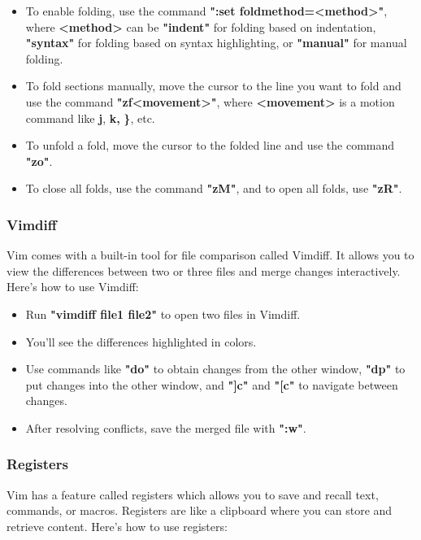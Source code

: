 \documentclass[titlepage]{article}
\begin{document}
\begin{itemize}
\item To enable folding, use the command \textbf{":set foldmethod=<method>"}, where \textbf{<method>} can be \textbf{"indent"} for folding based on indentation, \textbf{"syntax"} for folding based on syntax highlighting, or \textbf{"manual"} for manual folding.
\item To fold sections manually, move the cursor to the line you want to fold and use the command \textbf{"zf<movement>"}, where \textbf{<movement>} is a motion command like \textbf{j}, \textbf{k,} \textbf{\}}, etc.
\item To unfold a fold, move the cursor to the folded line and use the command \textbf{"zo"}.
\item To close all folds, use the command \textbf{"zM"}, and to open all folds, use \textbf{"zR"}.
\end{itemize}

\subsubsection{Vimdiff}
Vim comes with a built-in tool for file comparison called Vimdiff. It allows you to view the differences between two or three files and merge changes interactively. Here's how to use Vimdiff:

\begin{itemize}
\item Run \textbf{"vimdiff file1 file2"} to open two files in Vimdiff.
\item You'll see the differences highlighted in colors.
\item Use commands like \textbf{"do"} to obtain changes from the other window, \textbf{"dp"} to put changes into the other window, and\textbf{ "]c"} and \textbf{"[c"} to navigate between changes.
\item After resolving conflicts, save the merged file with \textbf{":w"}.
\end{itemize}

\subsubsection{Registers}
Vim has a feature called registers which allows you to save and recall text, commands, or macros. Registers are like a clipboard where you can store and retrieve content. Here's how to use registers:
\end{document}
